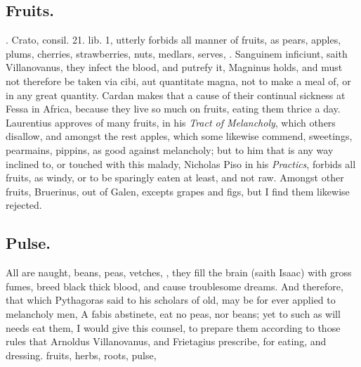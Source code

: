 {\subsection{Fruits.}
. Crato, consil. 21.
lib. 1, utterly forbids all manner of fruits, as pears, apples, plums,
cherries, strawberries, nuts, medlars, serves, \etc{}. Sanguinem inficiunt,
saith Villanovanus, they infect the blood, and putrefy it, Magninus
holds, and must not therefore be taken via cibi, aut quantitate magna,
not to make a meal of, or in any great quantity. Cardan makes
that a cause of their continual sickness at Fessa in Africa, because
they live so much on fruits, eating them thrice a day. Laurentius
approves of many fruits, in his \emph{Tract of Melancholy}, which others
disallow, and amongst the rest apples, which some likewise commend,
sweetings, pearmains, pippins, as good against melancholy; but to him
that is any way inclined to, or touched with this malady,
Nicholas Piso in his \emph{Practics}, forbids all fruits, as windy, or
to be sparingly eaten at least, and not raw. Amongst other fruits,
Bruerinus, out of Galen, excepts grapes and figs, but I find them
likewise rejected.
\subsection{Pulse.}
All  are naught, beans, peas, vetches, \etc{}, they fill
the brain (saith Isaac) with gross fumes, breed black thick blood, and
cause troublesome dreams. And therefore, that which Pythagoras said to
his scholars of old, may be for ever applied to melancholy men, A fabis
abstinete, eat no peas, nor beans; yet to such as will needs eat them,
I would give this counsel, to prepare them according to those rules
that Arnoldus Villanovanus, and Frietagius prescribe, for eating, and
dressing. fruits, herbs, roots, pulse, \etc{}
}
